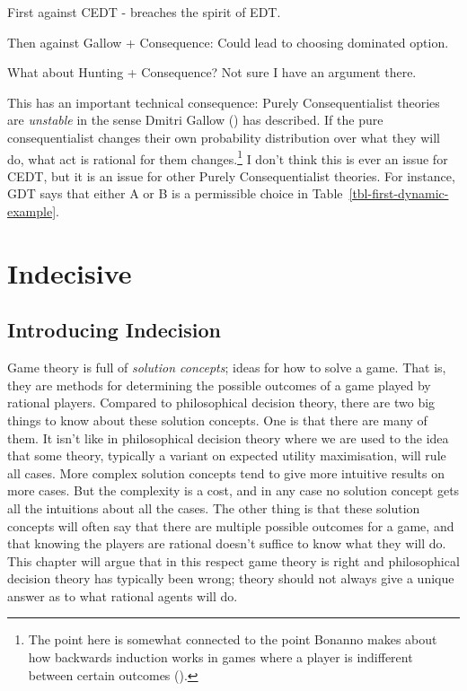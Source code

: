 \documentclass[
  12pt,
  letterpaper,
  DIV=11,
  numbers=noendperiod]{scrreprt}
\begin{document}
First against CEDT - breaches the spirit of EDT.

Then against Gallow + Consequence: Could lead to choosing dominated
option.

What about Hunting + Consequence? Not sure I have an argument there.

This has an important technical consequence: Purely Consequentialist
theories are \emph{unstable} in the sense Dmitri Gallow
() has described. If the pure
consequentialist changes their own probability distribution over what
they will do, what act is rational for them changes.\footnote{The point
  here is somewhat connected to the point Bonanno makes about how
  backwards induction works in games where a player is indifferent
  between certain outcomes ().} I don't think this is ever an issue for CEDT, but it is an
issue for other Purely Consequentialist theories. For instance, GDT says
that either A or B is a permissible choice in
Table~\ref{tbl-first-dynamic-example}.


\chapter{Indecisive}\label{sec-indecisive}

\section{Introducing Indecision}\label{sec-indecisive-intro}

Game theory is full of \emph{solution concepts}; ideas for how to solve
a game. That is, they are methods for determining the possible outcomes
of a game played by rational players. Compared to philosophical decision
theory, there are two big things to know about these solution concepts.
One is that there are many of them. It isn't like in philosophical
decision theory where we are used to the idea that some theory,
typically a variant on expected utility maximisation, will rule all
cases. More complex solution concepts tend to give more intuitive
results on more cases. But the complexity is a cost, and in any case no
solution concept gets all the intuitions about all the cases. The other
thing is that these solution concepts will often say that there are
multiple possible outcomes for a game, and that knowing the players are
rational doesn't suffice to know what they will do. This chapter will
argue that in this respect game theory is right and philosophical
decision theory has typically been wrong; theory should not always give
a unique answer as to what rational agents will do.
\end{document}
